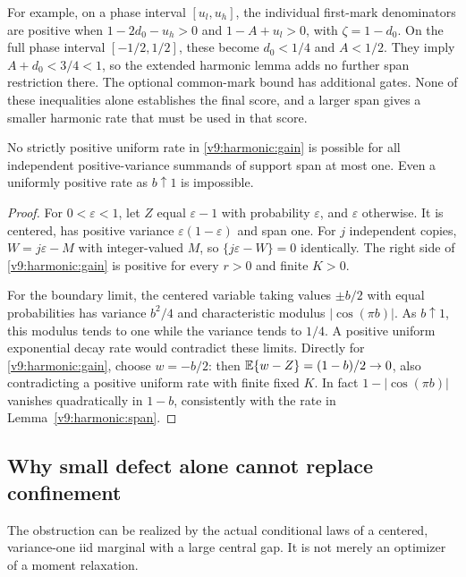 For example, on a phase interval $[u_l,u_h]$, the individual
first-mark denominators are positive when
$1-2d_0-u_h>0$ and $1-A+u_l>0$, with $\zeta=1-d_0$.
On the full phase interval $[-1/2,1/2]$, these become $d_0<1/4$
and $A<1/2$. They imply $A+d_0<3/4<1$, so the extended harmonic
lemma adds no further span restriction there. The optional common-mark
bound has additional gates. None of these inequalities alone establishes
the final score, and a larger span gives a smaller harmonic rate that must
be used in that score.

\begin{proposition}\label{v9:harmonic:boundary}
No strictly positive uniform rate in \eqref{v9:harmonic:gain} is possible for all
independent positive-variance summands of support span at most one.
Even a uniformly positive rate as $b\uparrow1$ is impossible.
\end{proposition}
\begin{proof}
For $0<\varepsilon<1$, let $Z$ equal $\varepsilon-1$ with probability
$\varepsilon$, and $\varepsilon$ otherwise. It is centered, has positive
variance $\varepsilon(1-\varepsilon)$ and span one.
For $j$ independent copies, $W=j\varepsilon-M$ with integer-valued
$M$, so $\{j\varepsilon-W\}=0$ identically. The right side of
\eqref{v9:harmonic:gain} is positive for every $r>0$ and finite $K>0$.

For the boundary limit, the centered variable taking values $\pm b/2$
with equal probabilities has variance $b^2/4$ and characteristic modulus
$|\cos(\pi b)|$. As $b\uparrow1$, this modulus tends to one while the
variance tends to $1/4$. A positive uniform exponential decay rate would
contradict these limits. Directly for \eqref{v9:harmonic:gain}, choose $w=-b/2$:
then $\mathbb E\{w-Z\}=(1-b)/2\to0$, also contradicting a positive uniform
rate with finite fixed $K$. In fact $1-|\cos(\pi b)|$ vanishes quadratically
in $1-b$, consistently with the rate in Lemma~\ref{v9:harmonic:span}.
\end{proof}

\subsection{Why small defect alone cannot replace confinement}
The obstruction can be realized by the actual conditional laws of a
centered, variance-one iid marginal with a large central gap. It is not
merely an optimizer of a moment relaxation.

